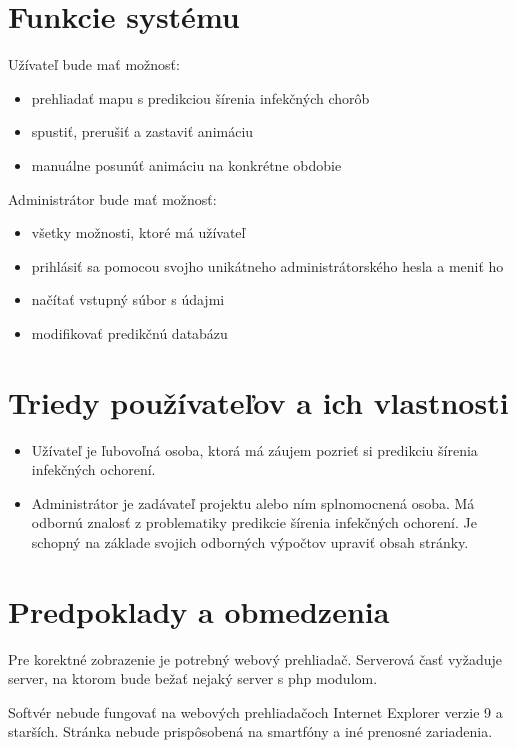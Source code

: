 \documentclass[12pt,a4paper]{report}
\begin{document}
\section[Funkcie systému]{\rmfamily\bfseries
	Funkcie systému}
Užívateľ bude mať možnosť:
\begin{itemize}
	\item prehliadať mapu s predikciou šírenia infekčných chorôb	
	\item spustiť, prerušiť a zastaviť animáciu
	\item manuálne posunúť animáciu na konkrétne obdobie
\end{itemize}
Administrátor bude mať možnosť:
\begin{itemize}
	\item všetky možnosti, ktoré má užívateľ 
	\item prihlásiť sa pomocou svojho unikátneho administrátorského hesla a meniť ho
	\item načítať vstupný súbor s údajmi
	\item modifikovať predikčnú databázu
\end{itemize}

\section[Triedy používateľov a ich vlastnosti]{\rmfamily\bfseries
	Triedy používateľov a ich vlastnosti}
\begin{itemize}
	\item Užívateľ je ľubovoľná osoba, ktorá má záujem pozrieť si predikciu šírenia infekčných ochorení.
	\item Administrátor je zadávateľ projektu alebo ním splnomocnená osoba. Má odbornú znalosť z problematiky predikcie šírenia infekčných ochorení. Je schopný
na základe svojich odborných výpočtov upraviť obsah stránky.
\end{itemize}

\section[Predpoklady a obmedzenia]{\rmfamily\bfseries
	Predpoklady a obmedzenia}
	Pre korektné zobrazenie je potrebný webový prehliadač. Serverová časť vyžaduje server, na ktorom bude bežať nejaký server s php modulom.\par
	Softvér nebude fungovať na webových prehliadačoch Internet Explorer verzie 9 a starších. Stránka nebude prispôsobená na smartfóny a iné prenosné zariadenia. 
\end{document}
